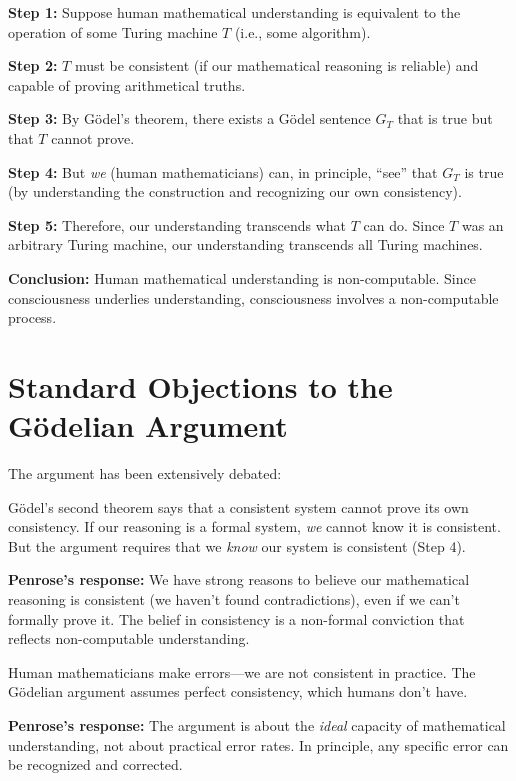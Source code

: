 \documentclass[11pt,a4paper]{report}
\begin{document}
\begin{principlebox}
\textbf{Step 1:} Suppose human mathematical understanding is equivalent to the operation of some Turing machine $T$ (i.e., some algorithm).

\textbf{Step 2:} $T$ must be consistent (if our mathematical reasoning is reliable) and capable of proving arithmetical truths.

\textbf{Step 3:} By G\"odel's theorem, there exists a G\"odel sentence $G_T$ that is true but that $T$ cannot prove.

\textbf{Step 4:} But \emph{we} (human mathematicians) can, in principle, ``see'' that $G_T$ is true (by understanding the construction and recognizing our own consistency).

\textbf{Step 5:} Therefore, our understanding transcends what $T$ can do. Since $T$ was an arbitrary Turing machine, our understanding transcends all Turing machines.

\textbf{Conclusion:} Human mathematical understanding is non-computable. Since consciousness underlies understanding, consciousness involves a non-computable process.
\end{principlebox}

\section{Standard Objections to the G\"odelian Argument}

The argument has been extensively debated:

\begin{objbox}
G\"odel's second theorem says that a consistent system cannot prove its own consistency. If our reasoning is a formal system, \emph{we} cannot know it is consistent. But the argument requires that we \emph{know} our system is consistent (Step 4).

\textbf{Penrose's response:} We have strong reasons to believe our mathematical reasoning is consistent (we haven't found contradictions), even if we can't formally prove it. The belief in consistency is a non-formal conviction that reflects non-computable understanding.
\end{objbox}

\begin{objbox}
Human mathematicians make errors---we are not consistent in practice. The G\"odelian argument assumes perfect consistency, which humans don't have.

\textbf{Penrose's response:} The argument is about the \emph{ideal} capacity of mathematical understanding, not about practical error rates. In principle, any specific error can be recognized and corrected.
\end{objbox}
\end{document}
